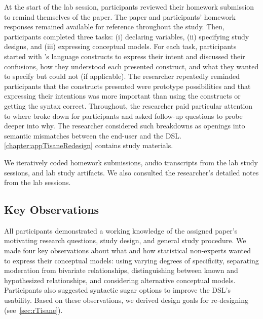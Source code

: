 
At the start of the lab session, participants reviewed their homework submission
to remind themselves of the paper. The paper and participants' homework
responses remained available for reference throughout the study. Then,
participants completed three tasks: (i) declaring variables, (ii) specifying
study designs, and (iii) expressing conceptual models. For each task,
participants started with \tisane's language constructs to express their intent
and discussed their confusions, how they understood each presented construct,
and what they wanted to specify but could not (if applicable). The researcher
repeatedly reminded participants that the constructs presented were prototype
possibilities and that expressing their intentions was more important than using
the constructs or getting the syntax correct. Throughout, the researcher paid
particular attention to where \tisane broke down for participants and asked
follow-up questions to probe deeper into why. The researcher considered such
breakdowns as openings into semantic mismatches between the end-user and the
DSL. \autoref{chapter:appTisaneRedesign} contains study materials.

We iteratively coded homework submissions, audio transcripts from the lab study
sessions, and lab study artifacts. We also consulted the
researcher's detailed notes from the lab sessions. 


\subsection{Key Observations}
All participants demonstrated a working knowledge of the assigned paper's
motivating research questions, study design, and general study procedure. 
We made four key observations about what and how statistical non-experts wanted
to express their conceptual models: using varying degrees of specificity,
separating moderation from bivariate relationships, distinguishing between known
and hypothesized relationships, and considering alternative conceptual models.
Participants also suggested syntactic sugar options to improve the DSL's
usability. Based on these observations, we derived design goals for re-designing
\tisane (see~\autoref{sec:rTisane}).

